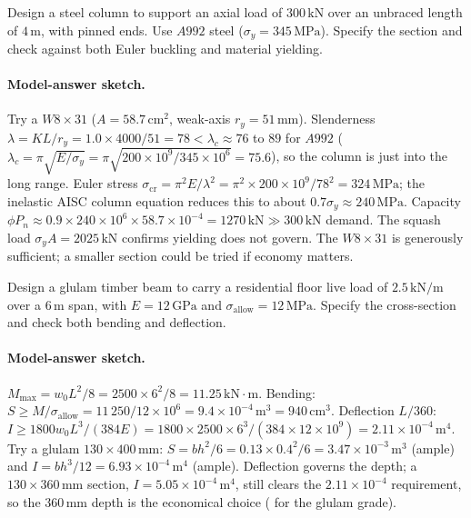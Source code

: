 \begin{exercise}
Design a steel column to support an axial load of $300\,\text{kN}$
over an unbraced length of $4\,\si{\meter}$, with pinned ends. Use
$A992$ steel ($\sigma_y = 345\,\text{MPa}$). Specify the section
and check against both Euler buckling and material yielding.

\paragraph{Model-answer sketch.} Try a $W8\times 31$ ($A = 58.7\,\text{cm}^2$,
weak-axis $r_y = 51\,\si{\milli\meter}$). Slenderness $\lambda = KL/r_y
= 1.0\times 4000/51 = 78 < \lambda_c \approx 76$ to $89$ for $A992$
($\lambda_c = \pi\sqrt{E/\sigma_y} = \pi\sqrt{200\times 10^9/345\times
10^6} = 75.6$), so the column is just into the long range. Euler stress
$\sigma_{\text{cr}} = \pi^2E/\lambda^2 = \pi^2\times 200\times 10^9/78^2
= 324\,\text{MPa}$; the inelastic AISC column equation reduces this to
about $0.7\sigma_y \approx 240\,\text{MPa}$. Capacity $\phi P_n \approx
0.9\times 240\times 10^6 \times 58.7\times 10^{-4} = 1270\,\text{kN}
\gg 300\,\text{kN}$ demand. The squash load $\sigma_y A = 2025\,\text{kN}$
confirms yielding does not govern. The $W8\times 31$ is generously
sufficient; a smaller section could be tried if economy matters.
\end{exercise}

\begin{exercise}
Design a glulam timber beam to carry a residential floor live load
of $2.5\,\text{kN}/\text{m}$ over a $6\,\si{\meter}$ span, with
$E = 12\,\text{GPa}$ and $\sigma_{\text{allow}} = 12\,\text{MPa}$.
Specify the cross-section and check both bending and deflection.

\paragraph{Model-answer sketch.} $M_{\max} = w_0L^2/8 = 2500\times 6^2/
8 = 11.25\,\text{kN}\cdot\text{m}$. Bending: $S \geq M/\sigma_{\text{allow}}
= 11\,250/12\times 10^6 = 9.4\times 10^{-4}\,\si{\meter\cubed} =
940\,\text{cm}^3$. Deflection $L/360$: $I \geq 1800 w_0 L^3/(384E) =
1800\times 2500\times 6^3/(384\times 12\times 10^9) = 2.11\times 10^{-4}
\,\si{\meter\tothe{4}}$. Try a glulam $130\times 400\,\si{\milli\meter}$:
$S = bh^2/6 = 0.13\times 0.4^2/6 = 3.47\times 10^{-3}\,\si{\meter\cubed}$
(ample) and $I = bh^3/12 = 6.93\times 10^{-4}\,\si{\meter\tothe{4}}$
(ample). Deflection governs the depth; a $130\times 360\,\si{\milli
\meter}$ section, $I = 5.05\times 10^{-4}\,\si{\meter\tothe{4}}$, still
clears the $2.11\times 10^{-4}$ requirement, so the $360\,\si{\milli
\meter}$ depth is the economical choice (
for the glulam grade).
\end{exercise}

